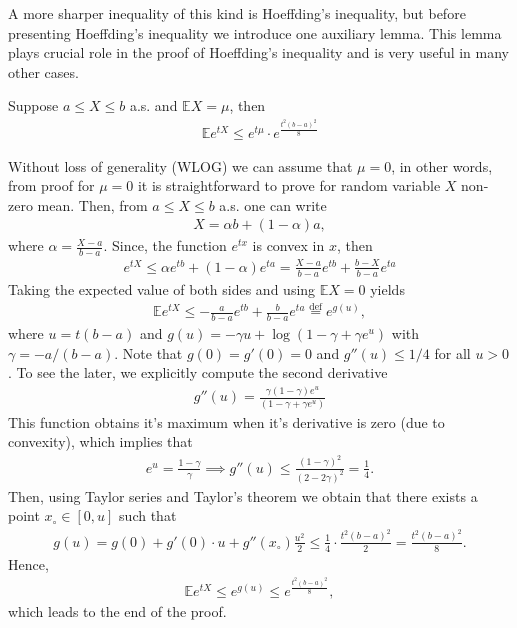 \par A more sharper inequality of this kind is Hoeffding's inequality, but
before presenting Hoeffding's inequality we introduce one auxiliary lemma. This lemma plays crucial role in the proof of Hoeffding's inequality and is very useful in many other cases.
\begin{lemma}
Suppose $a \le X \le b$ a.s. and $\mathbb{E} X = \mu$, then 
\begin{align}\label{hoef}
    \mathbb{E} e^{tX} \le e^{t\mu} \cdot e^{\frac{t^2(b-a)^2}{8}}
\end{align}
\end{lemma}
\begin{s}
Without loss of generality (WLOG) we can assume that $\mu = 0$, in other words, from proof for $\mu = 0$ it is straightforward to prove for random variable $X$ non-zero mean. Then, from $a \le X \le b$ a.s. one can write 
\begin{align*}
    X = \alpha b + (1-\alpha) a, 
\end{align*}
where $\alpha = \frac{X - a}{b - a}$. Since, the function $e^{tx}$ is convex in $x$, then 
\begin{align}
    e^{tX} \le \alpha e^{t b} + (1-\alpha) e^{ta} = \frac{X - a}{b - a} e^{t b} + \frac{b - X}{b - a} e^{ta}
\end{align}
Taking the expected value of both sides and using $\mathbb{E} X = 0$ yields  
\begin{align}
\mathbb{E} e^{tX} \le -\frac{a}{b - a} e^{tb} + \frac{b}{b - a}e^{ta} \stackrel{\text{def}}{=} e^{g(u)},
\end{align}
where $u = t(b-a)$ and $g(u) = -\gamma u + \log(1 - \gamma + \gamma e^u)$ with $\gamma = -a/(b-a)$. Note that $g(0) = g'(0) = 0$ and $g''(u) \le 1/4$ for all $u > 0$. To see the later, we explicitly compute the second derivative 
\begin{align*}
    g''(u) = \frac{\gamma(1-\gamma) e^u}{(1 - \gamma + \gamma e^u)}
\end{align*}
This function obtains it's maximum when it's derivative is zero (due to convexity), which implies that 
\begin{align*}
    e^u = \frac{1 - \gamma}{\gamma} \implies g''(u) \le \frac{(1-\gamma)^2}{(2 - 2\gamma)^2} = \frac{1}{4}.
\end{align*}
Then, using Taylor series and Taylor's theorem we obtain that there exists a point $x_{\circ} \in [0, u]$ such that 
\begin{align}
g(u) = g(0) + g'(0) \cdot u + g''(x_{\circ}) \frac{u^2}{2} \le \frac{1}{4} \cdot \frac{t^2(b-a)^2}{2} = \frac{t^2(b-a)^2}{8}.
\end{align}
Hence, 
\begin{align}
    \mathbb{E}e^{tX} \le e^{g(u)} \le e^{\frac{t^2(b-a)^2}{8}},
\end{align}
which leads to the end of the proof.
\end{s}
